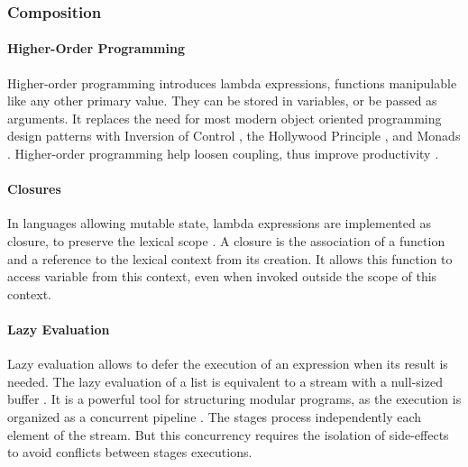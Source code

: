 \subsubsection{Composition} \label{chapter3:software-productivity:modularity:features}

\paragraph{Higher-Order Programming}
Higher-order programming introduces lambda expressions, functions manipulable like any other primary value.
They can be stored in variables, or be passed as arguments.
It replaces the need for most modern object oriented programming design patterns  with Inversion of Control \cite{Johnson}, the Hollywood Principle \cite{Sweet1985}, and Monads \cite{Wadler1992}.
Higher-order programming help loosen coupling, thus improve productivity \cite{Haynes1984}.

\paragraph{Closures}
In languages allowing mutable state, lambda expressions are implemented as closure, to preserve the lexical scope \cite{Sussman1998}.
A closure is the association of a function and a reference to the lexical context from its creation.
It allows this function to access variable from this context, even when invoked outside the scope of this context.

\paragraph{Lazy Evaluation}
Lazy evaluation allows to defer the execution of an expression when its result is needed.
The lazy evaluation of a list is equivalent to a stream with a null-sized buffer \cite{VanRoy2003}. %
It is a powerful tool for structuring modular programs, as the execution is organized as a concurrent pipeline \cite{Sussman1983}.
The stages process independently each element of the stream.
But this concurrency requires the isolation of side-effects to avoid conflicts between stages executions.


